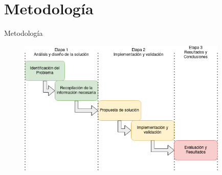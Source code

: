 \documentclass[
  24pt, %
  aspectratio=169, %
]{beamer}
\begin{document}
\section{Metodología}
\begin{frame}{Metodología}

  
  \begin{figure}
    \centering
    \includegraphics[width=10cm]{metodologia}
  \end{figure}
\end{frame}
\end{document}
